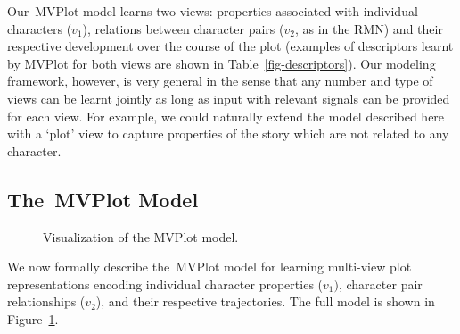 \documentclass[11pt,letterpaper]{article}
\begin{document}
Our~\mbox{MVPlot} model learns two views: properties associated with individual characters ($v_1$), relations between character pairs ($v_2$, as in the RMN) and their respective development over the course of the plot (examples of descriptors learnt by \mbox{MVPlot} for both views are shown in Table~\ref{fig-descriptors}). Our modeling framework, however, is very general in the sense that any number and type of views can be learnt jointly as long as input with relevant signals can be provided for each view. For example, we could naturally extend the model described here with a `plot' view to capture properties of the story which are not related to any character.


\subsection{The~\mbox{MVPlot} Model}
\label{ssec-mvplot}
\begin{figure}
\begin{center}
 
\end{center}
 \caption{Visualization of the MVPlot model.}
 \label{fig-model}
\end{figure}
We now formally describe the~\mbox{MVPlot} model for learning multi-view plot representations encoding individual character properties ($v_1)$, character pair relationships ($v_2$), and their respective trajectories. The full model is shown in Figure~\ref{fig-model}.
\end{document}
